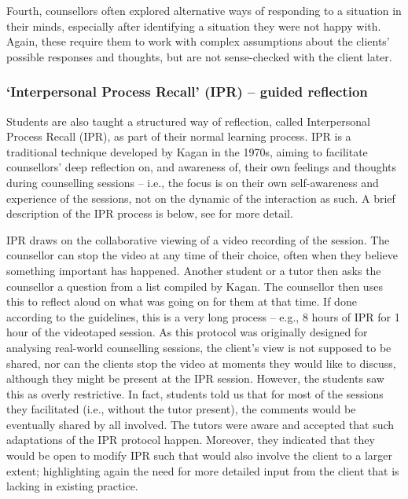 \documentclass{sigchi}
\begin{document}
Fourth, counsellors often explored alternative ways of responding to a situation in their minds, especially after identifying a situation they were not happy with. Again, these require them to work with complex assumptions about the clients' possible responses and thoughts, but are not sense-checked with the client later.


\enlargethispage{\baselineskip}
\subsubsection{`Interpersonal Process Recall' (IPR) -- guided reflection}
Students are also taught a structured way of reflection, called Interpersonal Process Recall (IPR), as part of their normal learning process. IPR is a traditional technique developed by Kagan \cite{kagan1969} in the 1970s, aiming to facilitate counsellors' deep reflection on, and awareness of, their own feelings and thoughts during counselling sessions -- i.e., the focus is on their own self-awareness and experience of the sessions, not on the dynamic of the interaction as such. A brief description of the IPR process is below, see \cite{Kagan1984} for more detail. 

IPR draws on the collaborative viewing of a video recording of the session. The counsellor can stop the video at any time of their choice, often when they believe something important has happened. Another student or a tutor then asks the counsellor a question from a list compiled by Kagan. The counsellor then uses this to reflect aloud on what was going on for them at that time. If done according to the guidelines, this is a very long process -- e.g., 8 hours of IPR for 1 hour of the videotaped session. As this protocol was originally designed for analysing real-world counselling sessions, the client's view is not supposed to be shared, nor can the clients stop the video at moments they would like to discuss, although they might be present at the IPR session. However, the students saw this as overly restrictive.
%
In fact, students told us that for most of the sessions they facilitated (i.e., without the tutor present), the comments would be eventually shared by all involved. The tutors were aware and accepted that such adaptations of the IPR protocol happen. Moreover, they indicated that they would be open to modify IPR such that would also involve the client to a larger extent; highlighting again the need for more detailed input from the client that is lacking in existing practice. 


\enlargethispage{\baselineskip}
\end{document}
